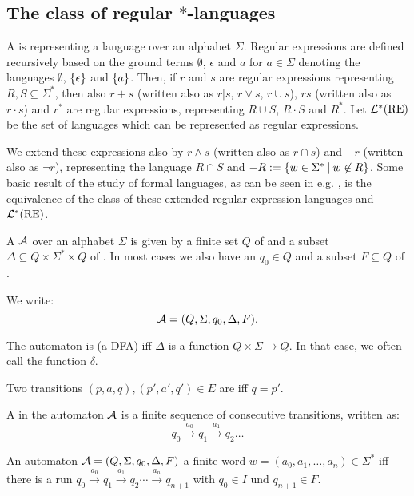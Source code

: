 \subsection{The class of regular $*$-languages}
\label{intro:reglang}

A  is representing a language over an alphabet $\Sigma$. Regular expressions are defined recursively based on the ground terms $\emptyset$, $\epsilon$ and $a$ for $a \in \Sigma$ denoting the languages $\emptyset$, $\Set{\epsilon}$ and $\Set{a}$. Then, if $r$ and $s$ are regular expressions representing $R, S \subseteq \Sigma^*$, then also $r+s$ (written also as $r|s$, $r \vee s$, $r \cup s$), $r s$ (written also as $r \cdot s$) and $r^*$ are regular expressions, representing $R \cup S$, $R \cdot S$ and $R^*$. Let $\mathcal{L}^*(\text{RE})$ be the set of languages which can be represented as regular expressions.

We extend these expressions also by $r \wedge s$ (written also as $r \cap s$) and $-r$ (written also as $\neg r$), representing the language $R \cap S$ and $-R := \Set{w \in \Sigma^*}{w \not\in R}$. Some basic result of the study of formal languages, as can be seen in e.g. \cite{FinAutLogR109}, is the equivalence of the class of these extended regular expression languages and $\mathcal{L}^*(\text{RE})$.

A   $\mathcal{A}$ over an alphabet $\Sigma$ is given by a finite set $Q$ of  and a subset $\Delta \subseteq Q \times \Sigma^* \times Q$ of . In most cases we also have an  $q_0 \in Q$ and a subset $F \subseteq Q$ of .

We write:
\[ \mathcal{A} = (Q, \Sigma, q_0, \Delta, F). \]

The automaton is  (a DFA) iff $\Delta$ is a function $Q \times \Sigma \rightarrow Q$. In that case, we often call the function $\delta$.

Two transitions $(p,a,q), (p',a',q') \in E$ are  iff $q=p'$.

A  in the automaton $\mathcal{A}$ is a finite sequence of consecutive transitions, written as:
\[ q_0 \xrightarrow{a_0} q_1 \xrightarrow{a_1} q_2 \dots \]

An automaton $\mathcal{A} = (Q, \Sigma, q_0, \Delta, F)$  a finite word $w = (a_0,a_1,\dots,a_n) \in \Sigma^*$ iff there is a run $q_0 \xrightarrow{a_0} q_1 \xrightarrow{a_1} q_2 \cdots \xrightarrow{a_n} q_{n+1}$ with $q_0 \in I$ und $q_{n+1} \in F$.

